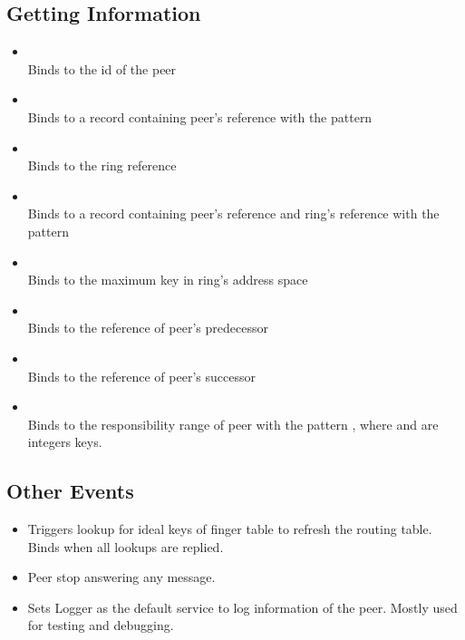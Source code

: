 \documentclass[11pt]{article}
\begin{document}
\subsection{Getting Information}

\begin{itemize}

\item {}\\ Binds  to the id of the peer

\item {}\\ Binds  to a record containing peer's
reference with the pattern\\ 

\item {}\\ Binds  to the ring reference

\item {}\\ Binds  to a record containing peer's
reference and ring's reference with the pattern  

\item {}\\ Binds  to the maximum key in ring's
address space

\item {}\\ Binds  to the reference of peer's
predecessor

\item {}\\ Binds  to the reference of peer's
successor

\item {}\\ Binds  to the responsibility range of
peer with the pattern , where  and  are
integers keys.

\end{itemize}

\subsection{Other Events}

\begin{itemize}

\item {} Triggers lookup for ideal keys of finger
table to refresh the routing table. Binds  when all lookups are
replied.

\item {} Peer stop answering any message. 

\item {} Sets Logger as the default service to log
information of the peer. Mostly used for testing and debugging.

\end{itemize}
\end{document}

